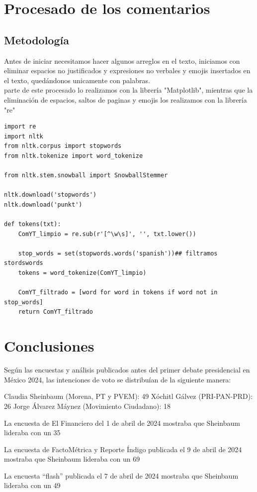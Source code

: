 \chapter{Procesado de los comentarios}

\section{Metodología}

Antes de iniciar necesitamos hacer algunos arreglos en el texto, iniciamos con eliminar espacios no justificados y expresiones no verbales y emojis insertados en el texto, quedándonos unicamente con palabras.\\

parte de este procesado lo realizamos con la librería "Matplotlib", mientras que la eliminación de espacios, saltos de paginas y emojis los realizamos con la librería "re"

\begin{lstlisting}
import re
import nltk
from nltk.corpus import stopwords
from nltk.tokenize import word_tokenize

from nltk.stem.snowball import SnowballStemmer

nltk.download('stopwords')
nltk.download('punkt')

def tokens(txt):
	ComYT_limpio = re.sub(r'[^\w\s]', '', txt.lower())
	
	stop_words = set(stopwords.words('spanish'))## filtramos stordswords 
	tokens = word_tokenize(ComYT_limpio)
	
	ComYT_filtrado = [word for word in tokens if word not in stop_words]
	return ComYT_filtrado
\end{lstlisting}




\chapter{Conclusiones}

Según las encuestas y análisis publicados antes del primer debate presidencial en México 2024, las intenciones de voto se distribuían de la siguiente manera:

Claudia Sheinbaum (Morena, PT y PVEM): 49%
Xóchitl Gálvez (PRI-PAN-PRD): 26%
Jorge Álvarez Máynez (Movimiento Ciudadano): 18%


La encuesta de El Financiero del 1 de abril de 2024 mostraba que Sheinbaum lideraba con un 35%

La encuesta de FactoMétrica y Reporte Índigo publicada el 9 de abril de 2024 mostraba que Sheinbaum lideraba con un 69%

La encuesta “flash” publicada el 7 de abril de 2024 mostraba que Sheinbaum lideraba con un 49%